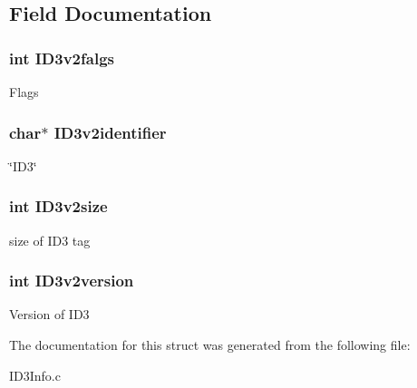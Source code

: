 \subsection{Field Documentation}
\hypertarget{structheader_a0a2e62855873b0bf76c06f7879920b8f}{
\subsubsection[{I\-D3v2falgs}]{\setlength{\rightskip}{0pt plus 5cm}int I\-D3v2falgs}}\label{structheader_a0a2e62855873b0bf76c06f7879920b8f}
Flags \hypertarget{structheader_ad055af347bd7da11f6d4faab7420becb}{
\subsubsection[{I\-D3v2identifier}]{\setlength{\rightskip}{0pt plus 5cm}char$\ast$ I\-D3v2identifier}}\label{structheader_ad055af347bd7da11f6d4faab7420becb}
\char`\"{}\-I\-D3\char`\"{} \hypertarget{structheader_a3c23bce3d043610e2574a51785451862}{
\subsubsection[{I\-D3v2size}]{\setlength{\rightskip}{0pt plus 5cm}int I\-D3v2size}}\label{structheader_a3c23bce3d043610e2574a51785451862}
size of I\-D3 tag \hypertarget{structheader_a6fe87d13c59018fdf8268af1b7a36689}{
\subsubsection[{I\-D3v2version}]{\setlength{\rightskip}{0pt plus 5cm}int I\-D3v2version}}\label{structheader_a6fe87d13c59018fdf8268af1b7a36689}
Version of I\-D3 

The documentation for this struct was generated from the following file\-:\begin{DoxyCompactItemize}
\item 
I\-D3\-Info.\-c\end{DoxyCompactItemize}
